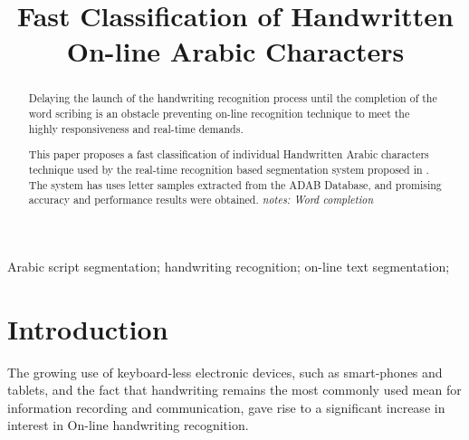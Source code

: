 \documentclass[10pt, conference, compsocconf]{IEEEtran}
\theoremstyle{definition}
\begin{document}
\title{Fast Classification of Handwritten On-line Arabic Characters}

\author{
\and
{}
}

\maketitle

\begin{abstract}
Delaying the launch of the handwriting recognition process until the completion of the word scribing is an obstacle preventing on-line recognition technique to meet the highly responsiveness and real-time demands.
 
This paper proposes a fast classification of individual Handwritten Arabic characters technique used by the real-time recognition based segmentation system proposed in \cite{kour2014real}.
The system has uses letter samples extracted from the ADAB Database, and promising accuracy and performance results were obtained.
\emph{notes: Word completion}
\end{abstract}

\begin{IEEEkeywords}
Arabic script segmentation; handwriting recognition; on-line text segmentation; 
\end{IEEEkeywords}


\section{Introduction}
The growing use of keyboard-less electronic devices, such as smart-phones and tablets, and the fact that handwriting remains the most commonly used mean for information recording and communication, gave rise to a significant increase in interest in On-line handwriting recognition.
\end{document}
